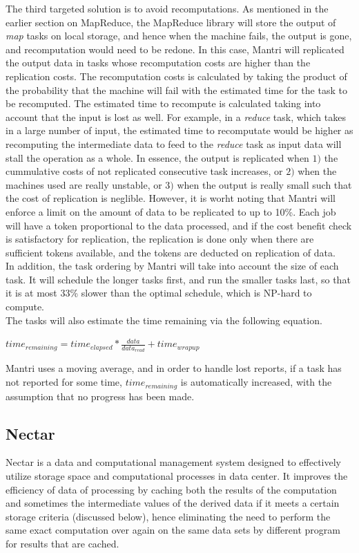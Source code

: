 \documentclass[]{article}
\begin{document}
The third targeted solution is to avoid recomputations. As mentioned in the earlier section on MapReduce, the MapReduce library will store the output of \emph{map} tasks on local storage, and hence when the machine fails, the output is gone, and recomputation would need to be redone. In this case, Mantri will replicated the output data in tasks whose recomputation costs are higher than the replication costs. The recomputation costs is calculated by taking the product of the probability that the machine will fail with the estimated time for the task to be recomputed. The estimated time to recompute is calculated taking into account that the input is lost as well. For example, in a \emph{reduce} task, which takes in a large number of input, the estimated time to recomputate would be higher as recomputing the intermediate data to feed to the \emph{reduce} task as input data will stall the operation as a whole. In essence, the output is replicated when $1)$ the cummulative costs of not replicated consecutive task increases, or $2)$ when the machines used are really unstable, or $3)$ when the output is really small such that the cost of replication is neglible. However, it is worht noting that Mantri will enforce a limit on the amount of data to be replicated to up to 10\%. Each job will have a token proportional to the data processed, and if the cost benefit check is satisfactory for replication, the replication is done only when there are sufficient tokens available, and the tokens are deducted on replication of data.\\

In addition, the task ordering by Mantri will take into account the size of each task. It will schedule the longer tasks first, and run the smaller tasks last, so that it is at most 33\% slower than the optimal schedule, which is NP-hard to compute.\\

The tasks will also estimate the time remaining via the following equation. 

$time_{remaining} = time_{elapsed} * \frac{data}{data_{read}} + time_{wrapup}$

Mantri uses a moving average, and in order to handle lost reports, if a task has not reported for some time, $time_{remaining}$ is automatically increased, with the assumption that no progress has been made.\\

\subsection{Nectar}
Nectar is a data and computational management system designed to effectively utilize storage space and computational processes in data center. It improves the efficiency of data of processing by caching both the results of the computation and sometimes the intermediate values of the derived data if it meets a certain storage criteria (discussed below), hence eliminating the need to perform the same exact computation over again on the same data sets by different program for results that are cached.\\
\end{document}
